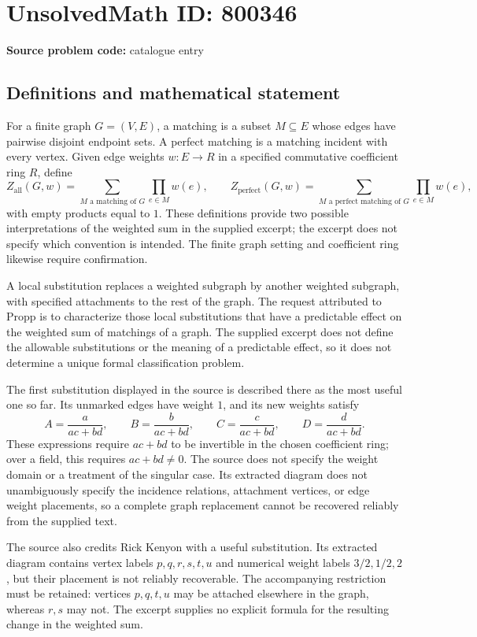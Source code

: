 \documentclass[11pt]{article}
\begin{document}
\section*{UnsolvedMath ID: 800346}
\textbf{Source problem code:} catalogue entry
\subsection{Definitions and mathematical statement}
For a finite graph \(G=(V,E)\), a matching is a subset \(M\subseteq E\) whose edges have pairwise disjoint endpoint sets. A perfect matching is a matching incident with every vertex. Given edge weights \(w:E\to R\) in a specified commutative coefficient ring \(R\), define
\[
Z_{\mathrm{all}}(G,w)=\sum_{M\text{ a matching of }G}\prod_{e\in M}w(e),\qquad
Z_{\mathrm{perfect}}(G,w)=\sum_{M\text{ a perfect matching of }G}\prod_{e\in M}w(e),
\]
with empty products equal to \(1\). These definitions provide two possible interpretations of the weighted sum in the supplied excerpt; the excerpt does not specify which convention is intended. The finite graph setting and coefficient ring likewise require confirmation.

A local substitution replaces a weighted subgraph by another weighted subgraph, with specified attachments to the rest of the graph. The request attributed to Propp is to characterize those local substitutions that have a predictable effect on the weighted sum of matchings of a graph. The supplied excerpt does not define the allowable substitutions or the meaning of a predictable effect, so it does not determine a unique formal classification problem.

The first substitution displayed in the source is described there as the most useful one so far. Its unmarked edges have weight \(1\), and its new weights satisfy
\[
A=\frac{a}{ac+bd},\qquad B=\frac{b}{ac+bd},\qquad C=\frac{c}{ac+bd},\qquad D=\frac{d}{ac+bd}.
\]
These expressions require \(ac+bd\) to be invertible in the chosen coefficient ring; over a field, this requires \(ac+bd\ne0\). The source does not specify the weight domain or a treatment of the singular case. Its extracted diagram does not unambiguously specify the incidence relations, attachment vertices, or edge weight placements, so a complete graph replacement cannot be recovered reliably from the supplied text.

The source also credits Rick Kenyon with a useful substitution. Its extracted diagram contains vertex labels \(p,q,r,s,t,u\) and numerical weight labels \(3/2,1/2,2\), but their placement is not reliably recoverable. The accompanying restriction must be retained: vertices \(p,q,t,u\) may be attached elsewhere in the graph, whereas \(r,s\) may not. The excerpt supplies no explicit formula for the resulting change in the weighted sum.
\end{document}
